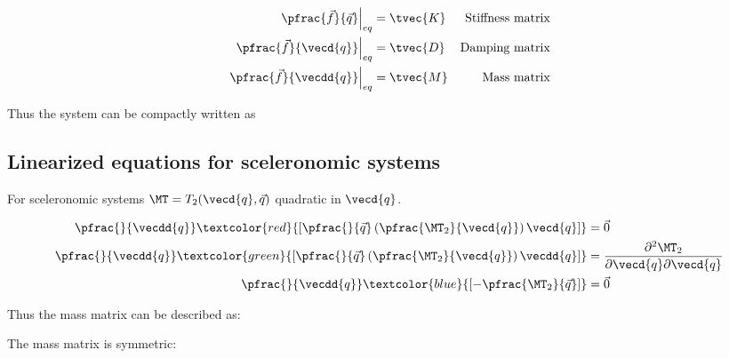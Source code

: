 \documentclass[10pt,a4paper]{scrartcl}
\begin{document}
\begin{multicols*}{2}
\begin{align*}
\left.\pfrac{\vec{f}}{\vec{q}}\right|_{eq}&=\tvec{K}&\text{Stiffness matrix}\\
\left.\pfrac{\vec{f}}{\vecd{q}}\right|_{eq}&=\tvec{D}&\text{Damping matrix}\\
\left.\pfrac{\vec{f}}{\vecdd{q}}\right|_{eq}&=\tvec{M}&\text{Mass matrix}
\end{align*}

Thus the system can be compactly written as 


\subsection{Linearized equations for sceleronomic systems}


For sceleronomic systems $\MT=T_2(\vecd{q},\vec{q})$ quadratic in $\vecd{q}$.


\begin{align*}
\pfrac{}{\vecdd{q}}\textcolor{red}{\left[\pfrac{}{\vec{q}}\left(\pfrac{\MT_2}{\vecd{q}}\right)\vecd{q}\right]}&=\vec{0}\\
\pfrac{}{\vecdd{q}}\textcolor{green}{\left[\pfrac{}{\vec{q}}\left(\pfrac{\MT_2}{\vecd{q}}\right)\vecdd{q}\right]}&=\frac{\partial^2\MT_2}{\partial\vecd{q}\partial\vecd{q}}\\
\pfrac{}{\vecdd{q}}\textcolor{blue}{\left[-\pfrac{\MT_2}{\vec{q}}\right]}&=\vec{0}
\end{align*}

Thus the mass matrix can be described as:


The mass matrix is symmetric:


\end{multicols*}
\end{document}
